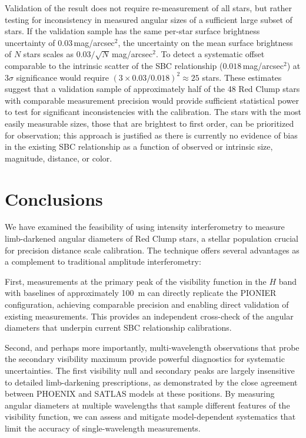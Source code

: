 \documentclass[linenumbers,trackchanges,margins]{aastex701}
\begin{document}
Validation
of the \citet{2019Natur.567..200P} result does not require re-measurement of
all stars, but rather testing for inconsistency in measured angular sizes of a sufficient large subset of stars.
If the validation sample has the same per-star surface brightness uncertainty of $0.03$\,mag/arcsec$^2$, the uncertainty on the mean surface brightness of $N$ stars scales as $0.03/\sqrt{N}$\,mag/arcsec$^2$. To detect a systematic offset comparable to the intrinsic scatter of the SBC relationship ($0.018$\,mag/arcsec$^2$) at $3\sigma$ significance would require $(3 \times 0.03/0.018)^2 \approx 25$ stars. These estimates suggest that a validation sample of approximately half of the 48 Red Clump stars with comparable measurement precision would provide sufficient statistical power to test for significant inconsistencies with the \citet{2019Natur.567..200P} calibration.
The stars with the most easily measurable sizes, those that are brightest to first order, can be prioritized for observation; this approach is justified as there is currently no evidence of bias in the existing SBC relationship as a function of observed or intrinsic size, magnitude, distance, or color.




\section{Conclusions}

We have examined the feasibility of using intensity interferometry to measure limb-darkened angular diameters of Red Clump stars, a stellar population crucial for precision distance scale calibration. The technique offers several advantages as a complement to traditional amplitude interferometry:

First, measurements at the primary peak of the visibility function in the $H$ band with baselines of approximately 100~m can directly replicate the PIONIER configuration, achieving comparable precision and enabling direct validation of existing measurements. This provides an independent cross-check of the angular diameters that underpin current SBC relationship calibrations.

Second, and perhaps more importantly, multi-wavelength observations that probe the secondary visibility maximum provide powerful diagnostics for systematic uncertainties. The first visibility null and secondary peaks are largely insensitive to detailed limb-darkening prescriptions, as demonstrated by the close agreement between PHOENIX and SATLAS models at these positions. By measuring angular diameters at multiple wavelengths that sample different features of the visibility function, we can assess and mitigate model-dependent systematics that limit the accuracy of single-wavelength measurements.
\end{document}
